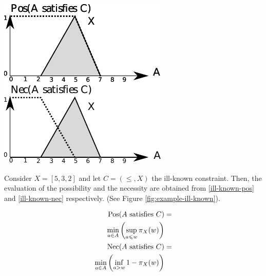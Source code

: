 \begin{samepage}
\vspace*{13pt}
\begin{center}
{
\includegraphics[scale=1]{./graphs/example-ill-known.pdf}
}
\end{center}
\vspace*{10pt}
\vspace*{13pt}
\end{samepage}


\begin{example}
Consider  $X = \left[5, 3, 2 \right]$ and let $C =(\leq, X)$ the ill-known constraint. Then, the evaluation of the possibility and the necessity are obtained from \eqref{ill-known-pos} and \eqref{ill-known-nec} respectively. (See Figure \ref{fig:example-ill-known}).






 
\begin{align}
\operatorname{Pos}(A\text{ satisfies }C) & =\\
\nonumber
\min_{a \in A}\left(\sup_{a \leqslant w}\pi_{X}(w)\right)\\
\operatorname{Nec}(A\text{ satisfies }C) & =\\
\nonumber
\min_{a \in A}\left(\inf_{a > w} 1-\pi_{X}(w)\right) 
\end{align}




\end{example}





